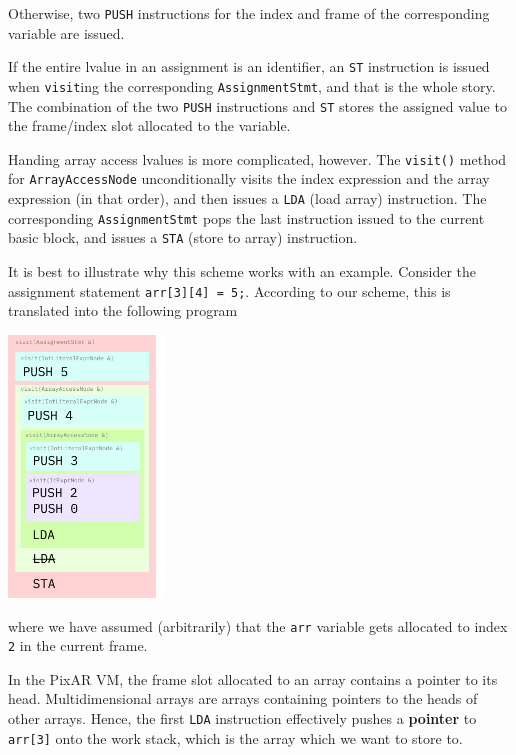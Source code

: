 \documentclass[11pt,a4paper]{scrartcl}
\begin{document}
Otherwise, two \verb|PUSH| instructions for the index and frame of the corresponding variable are issued.

If the entire lvalue in an assignment is an identifier, an \verb|ST| instruction is issued when \verb|visit|ing the corresponding \verb|AssignmentStmt|, and that is the whole story. The combination of the two \verb|PUSH| instructions and \verb|ST| stores the assigned value to the frame/index slot allocated to the variable.

Handing array access lvalues is more complicated, however. The \verb|visit()| method for \verb|ArrayAccessNode| unconditionally visits the index expression and the array expression (in that order), and then issues a \verb|LDA| (load array) instruction. The corresponding \verb|AssignmentStmt| pops the last instruction issued to the current basic block, and issues a \verb|STA| (store to array) instruction.

It is best to illustrate why this scheme works with an example. Consider the assignment statement \verb|arr[3][4] = 5;|. According to our scheme, this is translated into the following program

\begin{center}
  \includegraphics[width=0.31\textwidth]{lvalue_example}
\end{center}

where we have assumed (arbitrarily) that the \verb|arr| variable gets allocated to index \verb|2| in the current frame.

In the PixAR VM, the frame slot allocated to an array contains a pointer to its head. Multidimensional arrays are arrays containing pointers to the heads of other arrays. Hence, the first \verb|LDA| instruction effectively pushes a \textbf{pointer} to \verb|arr[3]| onto the work stack, which is the array which we want to store to.
\end{document}

